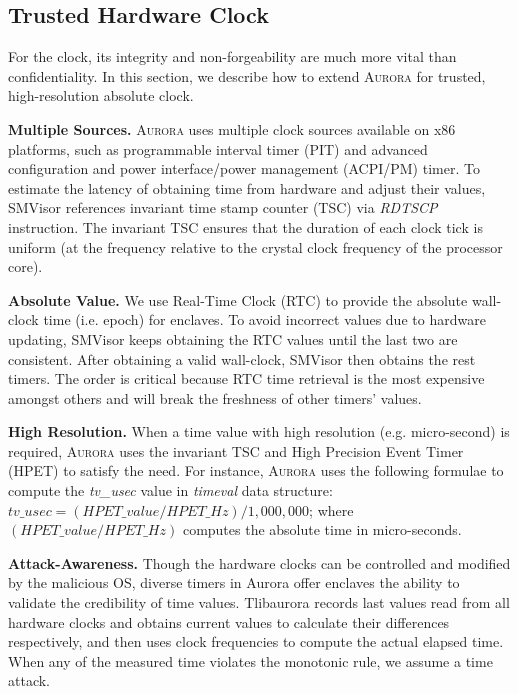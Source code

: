 \subsection{Trusted Hardware Clock}\label{time service}
For the clock, its integrity and non-forgeability are much more vital than confidentiality. %
In this section, we describe how to extend \textsc{Aurora} for trusted, high-resolution absolute clock. %

\textbf{Multiple Sources.}
\textsc{Aurora} uses multiple clock sources available on x86 platforms, such as programmable interval timer (PIT) and advanced configuration and power interface/power management (ACPI/PM) timer. To estimate the latency of obtaining time from hardware and adjust their values, SMVisor references invariant time stamp counter (TSC) via \textit{RDTSCP} instruction. The invariant TSC ensures that the duration of each clock tick is uniform (at the frequency relative to the crystal clock frequency of the processor core).

\textbf{Absolute Value.}
We use Real-Time Clock (RTC) to provide the absolute wall-clock time (i.e. epoch) for enclaves. To avoid incorrect values due to hardware updating, SMVisor keeps obtaining the RTC values until the last two are consistent. After obtaining a valid wall-clock, SMVisor then obtains the rest timers. The order is critical because RTC time retrieval is the most expensive amongst others and will break the freshness of other timers' values.

\textbf{High Resolution.}
When a time value with high resolution (e.g. micro-second) is required, \textsc{Aurora} uses the invariant TSC and High Precision Event Timer (HPET) to satisfy the need. For instance, \textsc{Aurora} uses the following formulae to compute the \textit{tv\_usec} value in \textit{timeval} data structure: {$tv\_usec = (HPET\_value/ HPET\_Hz) / 1,000,000$;} where $(HPET\_value / HPET\_Hz)$ computes the absolute time in micro-seconds.

\textbf{Attack-Awareness.}
Though the hardware clocks can be controlled and modified by the malicious OS, diverse timers in Aurora offer enclaves the ability to validate the credibility of time values. Tlibaurora records last values read from all hardware clocks and obtains current values to calculate their differences respectively, and then uses clock frequencies to compute the actual elapsed time. When any of the measured time violates the monotonic rule, we assume a time attack.

